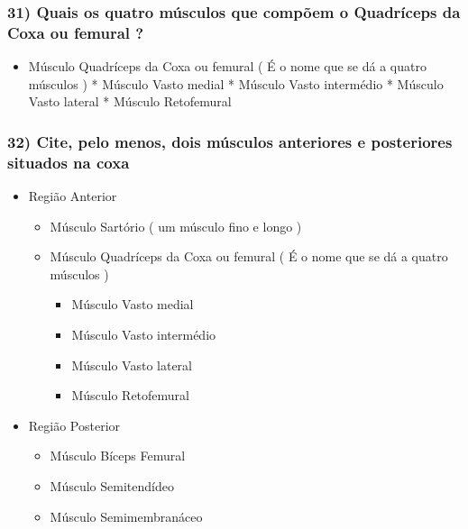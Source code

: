 \documentclass[
]{book}
\providecommand{\tightlist}{%
  \setlength{\itemsep}{0pt}\setlength{\parskip}{0pt}}
\begin{document}
\hypertarget{quais-os-quatro-muxfasculos-que-compuxf5em-o-quadruxedceps-da-coxa-ou-femural}{%
\subsubsection*{31) Quais os quatro músculos que compõem o Quadríceps da Coxa ou femural ?}\label{quais-os-quatro-muxfasculos-que-compuxf5em-o-quadruxedceps-da-coxa-ou-femural}}

\begin{itemize}
\tightlist
\item
  Músculo Quadríceps da Coxa ou femural ( É o nome que se dá a quatro músculos )
  * Músculo Vasto medial
  * Músculo Vasto intermédio
  * Músculo Vasto lateral
  * Músculo Retofemural
\end{itemize}

\hypertarget{cite-pelo-menos-dois-muxfasculos-anteriores-e-posteriores-situados-na-coxa}{%
\subsubsection*{32) Cite, pelo menos, dois músculos anteriores e posteriores situados na coxa}\label{cite-pelo-menos-dois-muxfasculos-anteriores-e-posteriores-situados-na-coxa}}

\begin{itemize}
\tightlist
\item
  Região Anterior

  \begin{itemize}
  \tightlist
  \item
    Músculo Sartório ( um músculo fino e longo )
  \item
    Músculo Quadríceps da Coxa ou femural ( É o nome que se dá a quatro músculos )

    \begin{itemize}
    \tightlist
    \item
      Músculo Vasto medial
    \item
      Músculo Vasto intermédio
    \item
      Músculo Vasto lateral
    \item
      Músculo Retofemural
    \end{itemize}
  \end{itemize}
\item
  Região Posterior

  \begin{itemize}
  \tightlist
  \item
    Músculo Bíceps Femural
  \item
    Músculo Semitendídeo
  \item
    Músculo Semimembranáceo
  \end{itemize}
\end{itemize}
\end{document}
